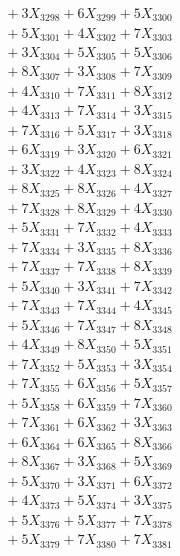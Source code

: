 \documentclass[a4paper,10pt]{article}
\begin{document}
{\begin{align}
&\;  + 3 X_{3298} + 6 X_{3299} + 5 X_{3300} \\[0.3ex]
&\;  + 5 X_{3301} + 4 X_{3302} + 7 X_{3303} \\[0.3ex]
&\;  + 3 X_{3304} + 5 X_{3305} + 5 X_{3306} \\[0.3ex]
&\;  + 8 X_{3307} + 3 X_{3308} + 7 X_{3309} \\[0.5ex]\allowbreak
&\;  + 4 X_{3310} + 7 X_{3311} + 8 X_{3312} \\[0.3ex]
&\;  + 4 X_{3313} + 7 X_{3314} + 3 X_{3315} \\[0.3ex]
&\;  + 7 X_{3316} + 5 X_{3317} + 3 X_{3318} \\[0.3ex]
&\;  + 6 X_{3319} + 3 X_{3320} + 6 X_{3321} \\[0.3ex]
&\;  + 3 X_{3322} + 4 X_{3323} + 8 X_{3324} \\[0.3ex]
&\;  + 8 X_{3325} + 8 X_{3326} + 4 X_{3327} \\[0.3ex]
&\;  + 7 X_{3328} + 8 X_{3329} + 4 X_{3330} \\[0.3ex]
&\;  + 5 X_{3331} + 7 X_{3332} + 4 X_{3333} \\[0.3ex]
&\;  + 7 X_{3334} + 3 X_{3335} + 8 X_{3336} \\[0.3ex]
&\;  + 7 X_{3337} + 7 X_{3338} + 8 X_{3339} \\[0.5ex]\allowbreak
&\;  + 5 X_{3340} + 3 X_{3341} + 7 X_{3342} \\[0.3ex]
&\;  + 7 X_{3343} + 7 X_{3344} + 4 X_{3345} \\[0.3ex]
&\;  + 5 X_{3346} + 7 X_{3347} + 8 X_{3348} \\[0.3ex]
&\;  + 4 X_{3349} + 8 X_{3350} + 5 X_{3351} \\[0.3ex]
&\;  + 7 X_{3352} + 5 X_{3353} + 3 X_{3354} \\[0.3ex]
&\;  + 7 X_{3355} + 6 X_{3356} + 5 X_{3357} \\[0.3ex]
&\;  + 5 X_{3358} + 6 X_{3359} + 7 X_{3360} \\[0.3ex]
&\;  + 7 X_{3361} + 6 X_{3362} + 3 X_{3363} \\[0.3ex]
&\;  + 6 X_{3364} + 6 X_{3365} + 8 X_{3366} \\[0.3ex]
&\;  + 8 X_{3367} + 3 X_{3368} + 5 X_{3369} \\[0.5ex]\allowbreak
&\;  + 5 X_{3370} + 3 X_{3371} + 6 X_{3372} \\[0.3ex]
&\;  + 4 X_{3373} + 5 X_{3374} + 3 X_{3375} \\[0.3ex]
&\;  + 5 X_{3376} + 5 X_{3377} + 7 X_{3378} \\[0.3ex]
&\;  + 5 X_{3379} + 7 X_{3380} + 7 X_{3381} \\[0.3ex]

\end{align}}
\end{document}
